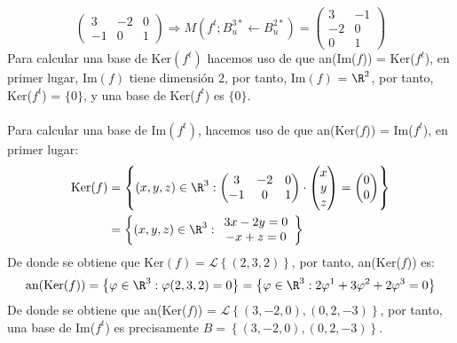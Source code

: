 \begin{ejercicio}
\begin{equation*}
\begin{pmatrix}
			3  & -2 & 0 \\
			-1 & 0  & 1
		\end{pmatrix} \Rightarrow M\left(f^t;B^{3*}_u \leftarrow B^{2*}_u\right) = \begin{pmatrix}
			3  & -1 \\
			-2 & 0  \\
			0  & 1
		\end{pmatrix}
	\end{equation*}
	Para calcular una base de Ker$(f^t)$ hacemos uso de que an(Im($f$)) = Ker($f^t$), en primer lugar, Im$(f)$
	tiene dimensión $2$, por tanto, Im$(f)$ = $\R^2$, por tanto, Ker($f^t$) = $\{0\}$, y una base de Ker($f^t$) es $\{0\}$. \\ \\
	Para calcular una base de Im$(f^t)$, hacemos uso de que an(Ker($f$)) = Im($f^t$), en primer lugar:
	\begin{align*}
		\text{Ker}(f) &= \left\{ (x,y,z) \in \R^3 : \begin{pmatrix}
			3  & -2 & 0 \\
			-1 & 0  & 1
		\end{pmatrix} \cdot \begin{pmatrix}
			x \\
			y \\
			z
		\end{pmatrix} = \begin{pmatrix}
			0 \\
			0
		\end{pmatrix}\right\} \\&= \left\{ (x,y,z) \in \R^3 : \begin{array}{cc}
			3x -2y = 0 \\
			-x + z = 0
		\end{array}\right\}
	\end{align*}
	De donde se obtiene que $\text{Ker}(f) = \mathcal{L}\left\{ (2,3,2)\right\}$, por tanto, an(Ker($f$)) es:
	\begin{equation*}
		\text{an}(\text{Ker}(f)) = \left\{ \varphi \in \R^3 : \varphi(2,3,2) = 0\right\} = \left\{ \varphi \in \R^3 : 2\varphi^1 + 3\varphi^2 + 2\varphi^3 = 0\right\}
	\end{equation*}
	De donde se obtiene que an(Ker($f$)) = $\mathcal{L}\left\{ (3,-2,0), (0,2,-3)\right\}$, por tanto, una base de Im($f^t$) es precisamente
	$B = \left\{ (3,-2,0), (0,2,-3)\right\}$.

\end{ejercicio}



